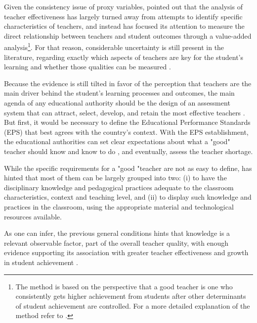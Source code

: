 Given the consistency issue of proxy variables, \citet{Hanushek_et_al_2012} pointed out that the analysis of teacher effectiveness has largely turned away from attempts to identify specific characteristics of teachers, and instead has focused its attention to measure the direct relationship between teachers and student outcomes through a value-added analysis\footnote{The method is based on the perspective that a good teacher is one who consistently gets higher achievement from students after other determinants of student achievement are controlled. For a more detailed explanation of the method refer to \citet{Scherrer_2011}.}. For that reason, considerable uncertainty is still present in the literature, regarding exactly which aspects of teachers are key for the student's learning and whether those qualities can be measured \citep{Rockoff_2004, Clotfelter_et_al_2006}.

Because the evidence is still tilted in favor of the perception that teachers are the main driver behind the student's learning processes and outcomes, the main agenda of any educational authority should be the design of an assessment system that can attract, select, develop, and retain the most effective teachers \citep{Elacqua_et_al_2018}. But first, it would be necessary to define the Educational Performance Standards (EPS) that best agrees with the country's context. With the EPS establishment, the educational authorities can set clear expectations about what a "good" teacher should know and know to do \citep{Hincapie_et_al_2020}, and eventually, assess the teacher shortage.

While the specific requirements for a "good "teacher are not as easy to define, \citet{Hincapie_et_al_2020} has hinted that most of them can be largely grouped into two: (i) to have the disciplinary knowledge and pedagogical practices adequate to the classroom characteristics, context and teaching level, and (ii) to display such knowledge and practices in the classroom, using the appropriate material and technological resources available. 

As one can infer, the previous general conditions hints that knowledge is a relevant observable factor, part of the overall teacher quality, with enough evidence supporting its association with greater teacher effectiveness and growth in student achievement \citep{Clotfelter_et_al_2006, Clotfelter_et_al_2007, Kane_et_al_2011, Kane_et_al_2012, Ome_2012, Metzler_et_al_2012, Kane_et_al_2013, Araujo_et_al_2016, Bietenbeck_et_al_2018, Estrada_2019}.

